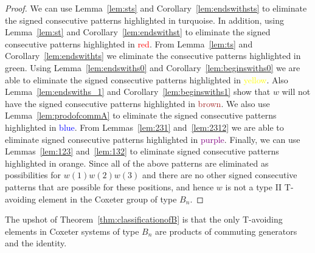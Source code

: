 \begin{theorem}
\begin{proof}
We can use Lemma~\ref{lem:sts} and Corollary~\ref{lem:endswithsts} to eliminate the signed consecutive patterns highlighted in \textcolor{turq}{turquoise}. In addition, using Lemma~\ref{lem:st} and Corollary~\ref{lem:endswithst} to eliminate the signed consecutive patterns highlighted in \textcolor{red}{red}. From Lemma~\ref{lem:ts} and Corollary~\ref{lem:endswithts} we eliminate the consecutive patterns highlighted in \textcolor{ggreen}{green}.  Using Lemma~\ref{lem:endswiths0} and Corollary~\ref{lem:beginswiths0} we are able to eliminate the signed consecutive patterns highlighted in \textcolor{yellow}{yellow}. Also Lemma~\ref{lem:endswiths_1} and Corollary~\ref{lem:beginswiths1} show that $w$ will not have the signed consecutive patterns highlighted in \textcolor{brown}{brown}. We also use Lemma~\ref{lem:prodofcommA} to eliminate the signed consecutive patterns highlighted in \textcolor{blue}{blue}. From Lemmas~\ref{lem:231} and~\ref{lem:2312} we are able to eliminate signed consecutive patterns highlighted in \textcolor{purple}{purple}. Finally, we can use Lemmas~\ref{lem:123} and~\ref{lem:132} to eliminate signed consecutive patterns highlighted in \textcolor{orange2}{orange}. Since all of the above patterns are eliminated as possibilities for $w(1)w(2)w(3)$ and there are no other signed consecutive patterns that are possible for these positions, and hence $w$ is not a type II T-avoiding element in the Coxeter group of type $B_n$.
\end{proof}
\end{theorem}


The upshot of Theorem~\ref{thm:classificationofB} is that the only T-avoiding elements in Coxeter systems of type $B_n$ are products of commuting generators and the identity.